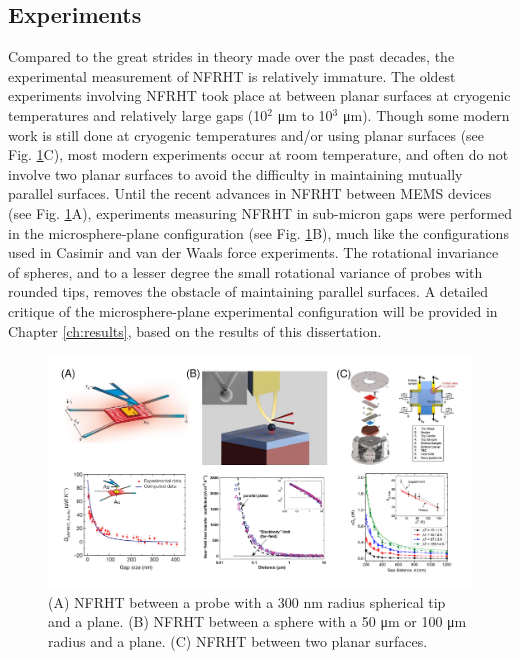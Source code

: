 \subsection{Experiments}
%
Compared to the great strides in theory made over the past decades, the experimental measurement of NFRHT is relatively immature. The oldest experiments involving NFRHT took place at between planar surfaces at cryogenic temperatures and relatively large gaps (10$^{2}$ \si{\micro\meter} to 10$^{3}$ \si{\micro\meter}).\cite{Cravalho1968, Domoto1970a} Though some modern work is still done at cryogenic temperatures\cite{Kralik2012} and/or using planar surfaces\cite{Kralik2012, Ghashami2018} (see Fig. \ref{fig:NFRHT_Experiments}C), most modern experiments occur at room temperature, and often do not involve two planar surfaces to avoid the difficulty in maintaining mutually parallel surfaces. Until the recent advances in NFRHT between MEMS devices\cite{Song2016, Cui2017, Fiorino2018} (see Fig. \ref{fig:NFRHT_Experiments}A), experiments measuring NFRHT in sub-micron gaps were performed in the microsphere-plane configuration (see Fig. \ref{fig:NFRHT_Experiments}B), much like the configurations used in Casimir and van der Waals force experiments.\cite{Lamoreaux1997, Mohideen1998, Roy1999, Harris2000} The rotational invariance of spheres, and to a lesser degree the small rotational variance of probes with rounded tips, removes the obstacle of maintaining parallel surfaces. A detailed critique of the microsphere-plane experimental configuration will be provided in Chapter \ref{ch:results}, based on the results of this dissertation.

\begin{figure}
\centering
\includegraphics[width=\textwidth]{./Figures/NFRHT_Experiments.pdf}
\caption{\label{fig:NFRHT_Experiments}(A) NFRHT between a probe with a 300 \si{\nano\meter} radius spherical tip and a plane.\cite{Kim2015} (B) NFRHT between a sphere with a 50 \si{\micro\meter} or 100 \si{\micro\meter} radius and a plane.\cite{Shen2009} (C) NFRHT between two planar surfaces.\cite{Ghashami2018}}
\end{figure}


